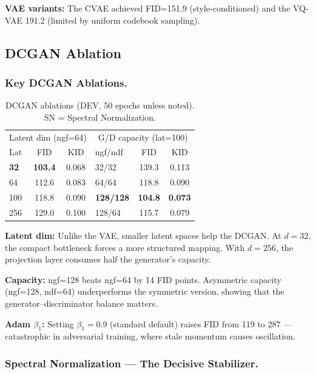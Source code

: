 \documentclass[runningheads]{llncs}
\begin{document}
\textbf{VAE variants:} The CVAE achieved FID=151.9 (style-conditioned) and the VQ-VAE 191.2 (limited by uniform codebook sampling).

\subsection{DCGAN Ablation}\label{sec:gan_ablation}

\subsubsection{Key DCGAN Ablations.}

\begin{table}[htbp]
\caption{DCGAN ablations (DEV, 50 epochs unless noted). SN = Spectral Normalization.}\label{tab:dcgan_ablation}
\centering\small
\begin{tabular}{lcc|lcc}
\toprule
\multicolumn{3}{c|}{Latent dim (ngf=64)} & \multicolumn{3}{c}{G/D capacity (lat=100)} \\
Lat & FID & KID & ngf/ndf & FID & KID \\
\midrule
\textbf{32} & \textbf{103.4} & 0.068 & 32/32 & 139.3 & 0.113 \\
64 & 112.6 & 0.083 & 64/64 & 118.8 & 0.090 \\
100 & 118.8 & 0.090 & \textbf{128/128} & \textbf{104.8} & \textbf{0.073} \\
256 & 129.0 & 0.100 & 128/64 & 115.7 & 0.079 \\
\bottomrule
\end{tabular}
\end{table}

\textbf{Latent dim:} Unlike the VAE, smaller latent spaces help the DCGAN. At $d=32$, the compact bottleneck forces a more structured mapping. With $d=256$, the projection layer consumes half the generator's capacity.

\textbf{Capacity:} ngf=128 beats ngf=64 by 14 FID points. Asymmetric capacity (ngf=128, ndf=64) underperforms the symmetric version, showing that the generator--discriminator balance matters.

\textbf{Adam $\beta_1$:} Setting $\beta_1=0.9$ (standard default) raises FID from 119 to 287 --- catastrophic in adversarial training, where stale momentum causes oscillation.

\subsubsection{Spectral Normalization --- The Decisive Stabilizer.}
\end{document}
